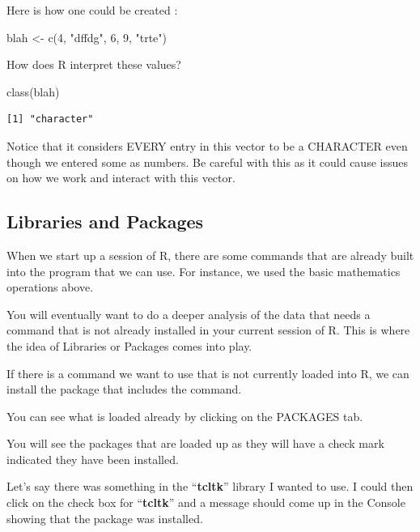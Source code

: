 \documentclass[
  letterpaper,
  DIV=11,
  numbers=noendperiod]{scrreprt}
\newenvironment{Shaded}{\begin{snugshade}}{\end{snugshade}}
\newcommand{\DecValTok}[1]{\textcolor[rgb]{0.68,0.00,0.00}{#1}}
\newcommand{\FunctionTok}[1]{\textcolor[rgb]{0.28,0.35,0.67}{#1}}
\newcommand{\NormalTok}[1]{\textcolor[rgb]{0.00,0.23,0.31}{#1}}
\newcommand{\OtherTok}[1]{\textcolor[rgb]{0.00,0.23,0.31}{#1}}
\newcommand{\StringTok}[1]{\textcolor[rgb]{0.13,0.47,0.30}{#1}}
\begin{document}
Here is how one could be created :

\begin{Shaded}
\begin{Highlighting}[]
\NormalTok{blah }\OtherTok{\textless{}{-}} \FunctionTok{c}\NormalTok{(}\DecValTok{4}\NormalTok{, }\StringTok{"dffdg"}\NormalTok{, }\DecValTok{6}\NormalTok{, }\DecValTok{9}\NormalTok{, }\StringTok{"trte"}\NormalTok{)}
\end{Highlighting}
\end{Shaded}

How does R interpret these values?

\begin{Shaded}
\begin{Highlighting}[]
\FunctionTok{class}\NormalTok{(blah)}
\end{Highlighting}
\end{Shaded}

\begin{verbatim}
[1] "character"
\end{verbatim}

Notice that it considers EVERY entry in this vector to be a CHARACTER
even though we entered some as numbers. Be careful with this as it could
cause issues on how we work and interact with this vector.

\subsection*{Libraries and Packages}\label{libraries-and-packages}

When we start up a session of R, there are some commands that are
already built into the program that we can use. For instance, we used
the basic mathematics operations above.

You will eventually want to do a deeper analysis of the data that needs
a command that is not already installed in your current session of R.
This is where the idea of Libraries or Packages comes into play.

If there is a command we want to use that is not currently loaded into
R, we can install the package that includes the command.

You can see what is loaded already by clicking on the PACKAGES tab.

You will see the packages that are loaded up as they will have a check
mark indicated they have been installed.

Let's say there was something in the ``\textbf{tcltk}'' library I wanted
to use. I could then click on the check box for ``\textbf{tcltk}'' and a
message should come up in the Console showing that the package was
installed.
\end{document}
